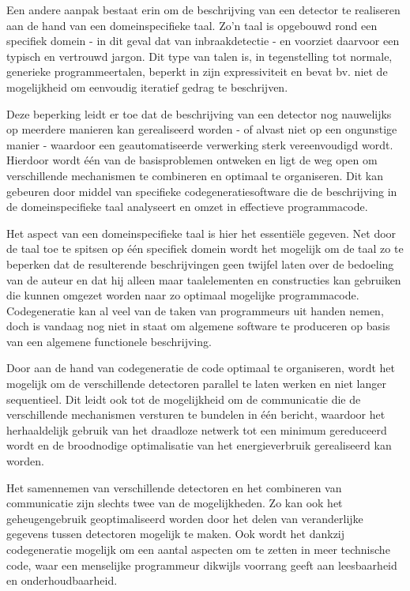 \documentclass[DIV=calc,paper=a4,fontsize=11pt,twocolumn]{scrartcl}
\begin{document}
Een andere aanpak bestaat erin om de beschrijving van een detector te
realiseren aan de hand van een domeinspecifieke taal. Zo'n taal is opgebouwd
rond een specifiek domein - in dit geval dat van inbraakdetectie - en voorziet
daarvoor een typisch en vertrouwd jargon. Dit type van talen is, in
tegenstelling tot normale, generieke programmeertalen, beperkt in zijn
expressiviteit en bevat bv. niet de mogelijkheid om eenvoudig iteratief gedrag
te beschrijven.

Deze beperking leidt er toe dat de beschrijving van een detector nog nauwelijks
op meerdere manieren kan gerealiseerd worden - of alvast niet op een ongunstige
manier - waardoor een geautomatiseerde verwerking sterk vereenvoudigd wordt.
Hierdoor wordt \'e\'en van de basisproblemen ontweken en ligt de weg open om
verschillende mechanismen te combineren en optimaal te organiseren. Dit kan
gebeuren door middel van specifieke codegeneratiesoftware die de beschrijving
in de domeinspecifieke taal analyseert en omzet in effectieve programmacode.

Het aspect van een domeinspecifieke taal is hier het essenti\"ele gegeven. Net
door de taal toe te spitsen op \'e\'en specifiek domein wordt het mogelijk om
de taal zo te beperken dat de resulterende beschrijvingen geen twijfel laten
over de bedoeling van de auteur en dat hij alleen maar taalelementen en
constructies kan gebruiken die kunnen omgezet worden naar zo optimaal mogelijke
programmacode. Codegeneratie kan al veel van de taken van programmeurs uit
handen nemen, doch is vandaag nog niet in staat om algemene software te
produceren op basis van een algemene functionele beschrijving.

Door aan de hand van codegeneratie de code optimaal te organiseren, wordt het
mogelijk om de verschillende detectoren parallel te laten werken en niet langer
sequentieel. Dit leidt ook tot de mogelijkheid om de communicatie die de
verschillende mechanismen versturen te bundelen in \'e\'en bericht, waardoor
het herhaaldelijk gebruik van het draadloze netwerk tot een minimum gereduceerd
wordt en de broodnodige optimalisatie van het energieverbruik gerealiseerd kan
worden.

Het samennemen van verschillende detectoren en het combineren van communicatie
zijn slechts twee van de mogelijkheden. Zo kan ook het geheugengebruik
geoptimaliseerd worden door het delen van veranderlijke gegevens tussen
detectoren mogelijk te maken. Ook wordt het dankzij codegeneratie mogelijk om
een aantal aspecten om te zetten in meer technische code, waar een menselijke
programmeur dikwijls voorrang geeft aan leesbaarheid en onderhoudbaarheid.
\end{document}
